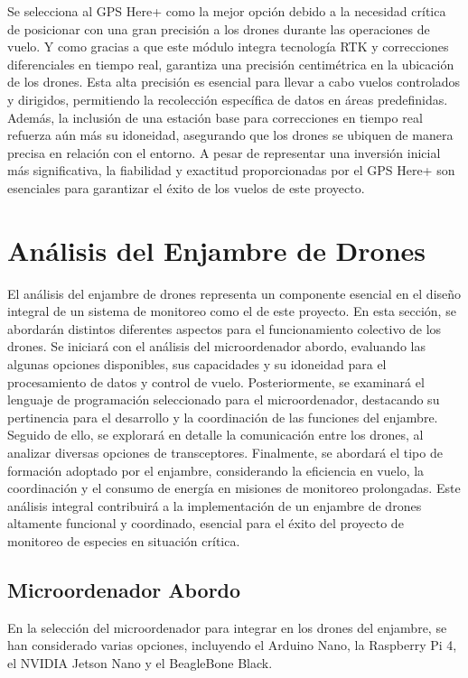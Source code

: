 Se selecciona al GPS Here+ como la mejor opción debido a la necesidad crítica de posicionar con una gran precisión a los drones durante las operaciones de vuelo. Y como gracias a que este módulo integra tecnología RTK y correcciones diferenciales en tiempo real, garantiza una precisión centimétrica en la ubicación de los drones. Esta alta precisión es esencial para llevar a cabo vuelos controlados y dirigidos, permitiendo la recolección específica de datos en áreas predefinidas. Además, la inclusión de una estación base para correcciones en tiempo real refuerza aún más su idoneidad, asegurando que los drones se ubiquen de manera precisa en relación con el entorno. A pesar de representar una inversión inicial más significativa, la fiabilidad y exactitud proporcionadas por el GPS Here+ son esenciales para garantizar el éxito de los vuelos de este proyecto.

\newpage
\section{Análisis del Enjambre de Drones}

El análisis del enjambre de drones representa un componente esencial en el diseño integral de un sistema de monitoreo como el de este proyecto. En esta sección, se abordarán distintos diferentes aspectos para el funcionamiento colectivo de los drones. Se iniciará con el análisis del microordenador abordo, evaluando las algunas opciones disponibles, sus capacidades y su idoneidad para el procesamiento de datos y control de vuelo. Posteriormente, se examinará el lenguaje de programación seleccionado para el microordenador, destacando su pertinencia para el desarrollo y la coordinación de las funciones del enjambre. Seguido de ello, se explorará en detalle la comunicación entre los drones, al analizar diversas opciones de transceptores. Finalmente, se abordará el tipo de formación adoptado por el enjambre, considerando la eficiencia en vuelo, la coordinación y el consumo de energía en misiones de monitoreo prolongadas. Este análisis integral contribuirá a la implementación de un enjambre de drones altamente funcional y coordinado, esencial para el éxito del proyecto de monitoreo de especies en situación crítica.

\subsection{Microordenador Abordo}

En la selección del microordenador para integrar en los drones del enjambre, se han considerado varias opciones, incluyendo el Arduino Nano, la Raspberry Pi 4, el NVIDIA Jetson Nano y el BeagleBone Black.

